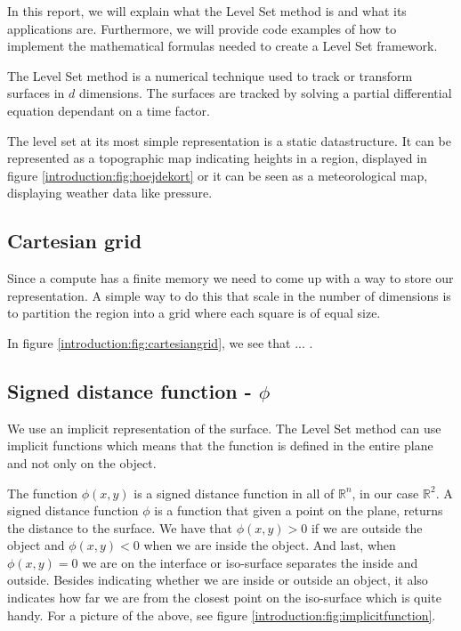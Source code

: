 In this report, we will explain what the Level Set method is and what its applications are. Furthermore, we will provide code examples of how to implement the mathematical formulas needed to create a Level Set framework. 

The Level Set method is a numerical technique used to track or transform surfaces in $d$ dimensions. The surfaces are tracked by solving a partial differential equation dependant on a time factor. 

The level set at its most simple representation is a static datastructure. It can be represented as a topographic map indicating heights in a region, displayed in figure \vref{introduction:fig:hoejdekort} or it can be seen as a meteorological map, displaying weather data like pressure.



\subsection{Cartesian grid}
\begin{comment}
  Finite memory -> descritization of plane -> cartesian grid is used.
\end{comment}

Since a compute has a finite memory we need to come up with a way to store our representation. A simple way to do this that scale in the number of dimensions is to partition the region into a grid where each square is of equal size.


In figure \vref{introduction:fig:cartesiangrid}, we see that ... .

\subsection{Signed distance function -  $\phi$}



We use an implicit representation of the surface. The Level Set method can use implicit functions which means that the function is defined in the entire plane and not only on the object.

The function $\phi(x,y)$ is a signed distance function in all of $\mathbb{R}^{n}$, in our case $\mathbb{R}^{2}$. A signed distance function $\phi$ is a function that given a point on the plane, returns the distance to the surface. We have that $\phi(x,y) > 0$ if we are outside the object and $\phi(x,y) < 0$ when we are inside the object. And last, when $\phi(x,y) = 0$ we are on the interface or iso-surface separates the inside and outside. Besides indicating whether we are inside or outside an object, it also indicates how far we are from the closest point on the iso-surface which is quite handy. For a picture of the above, see figure \vref{introduction:fig:implicitfunction}.

